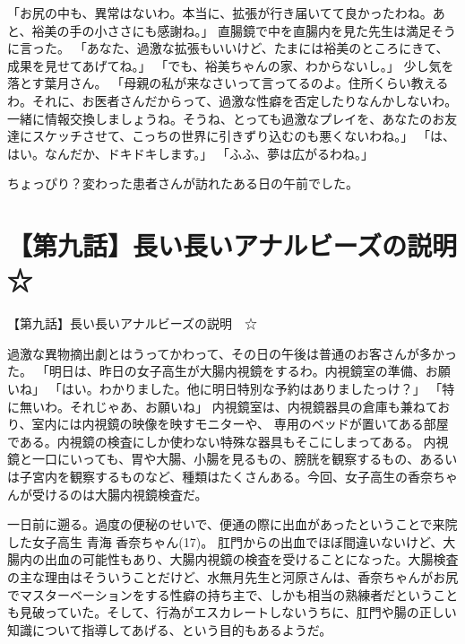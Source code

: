 「お尻の中も、異常はないわ。本当に、拡張が行き届いてて良かったわね。あと、裕美の手の小ささにも感謝ね。」
直腸鏡で中を直腸内を見た先生は満足そうに言った。
「あなた、過激な拡張もいいけど、たまには裕美のところにきて、成果を見せてあげてね。」
「でも、裕美ちゃんの家、わからないし。」
少し気を落とす葉月さん。
「母親の私が来なさいって言ってるのよ。住所くらい教えるわ。それに、お医者さんだからって、過激な性癖を否定したりなんかしないわ。一緒に情報交換しましょうね。そうね、とっても過激なプレイを、あなたのお友達にスケッチさせて、こっちの世界に引きずり込むのも悪くないわね。」
「は、はい。なんだか、ドキドキします。」
「ふふ、夢は広がるわね。」

ちょっぴり？変わった患者さんが訪れたある日の午前でした。



\section{【第九話】長い長いアナルビーズの説明　☆}
【第九話】長い長いアナルビーズの説明　☆

過激な異物摘出劇とはうってかわって、その日の午後は普通のお客さんが多かった。
「明日は、昨日の女子高生が大腸内視鏡をするわ。内視鏡室の準備、お願いね」
「はい。わかりました。他に明日特別な予約はありましたっけ？」
「特に無いわ。それじゃあ、お願いね」
内視鏡室は、内視鏡器具の倉庫も兼ねており、室内には内視鏡の映像を映すモニターや、
専用のベッドが置いてある部屋である。内視鏡の検査にしか使わない特殊な器具もそこにしまってある。
内視鏡と一口にいっても、胃や大腸、小腸を見るもの、膀胱を観察するもの、あるいは子宮内を観察するものなど、種類はたくさんある。今回、女子高生の香奈ちゃんが受けるのは大腸内視鏡検査だ。

一日前に遡る。過度の便秘のせいで、便通の際に出血があったということで来院した女子高生 青海 香奈ちゃん(17)。
肛門からの出血でほぼ間違いないけど、大腸内の出血の可能性もあり、大腸内視鏡の検査を受けることになった。大腸検査の主な理由はそういうことだけど、水無月先生と河原さんは、香奈ちゃんがお尻でマスターベーションをする性癖の持ち主で、しかも相当の熟練者だということも見破っていた。そして、行為がエスカレートしないうちに、肛門や腸の正しい知識について指導してあげる、という目的もあるようだ。

